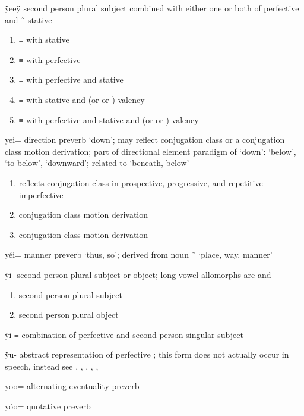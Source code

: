 \documentclass[12pt,letterpaper,oneside,article]{memoir}
\begin{document}
\begin{morphdesc}[resume*=alphalist]
\item[ÿeeÿ]
	second person plural subject  combined with either one or both of
		 perfective
		and  \~\  stative
	\begin{enumerate}
	\item	{} ≡ 
		with  stative
	\item	{} ≡ 
		with  perfective
	\item	{} ≡ 
		with  perfective and  stative
	\item	{} ≡ 
		with  stative and  (or  or ) valency
	\item	{} ≡ 
		with  perfective and  stative and  (or  or ) valency
	\end{enumerate}

\item[yei=]
	direction preverb ‘down’;
	may reflect  conjugation class or a  conjugation class motion derivation;
	part of directional element paradigm of  ‘down’:
		 ‘below’,  ‘to below’,  ‘downward’;
	related to  ‘beneath, below’
	\begin{enumerate}
	\item	reflects  conjugation class in prospective, progressive, and repetitive imperfective
	\item	{} conjugation class motion derivation
	\item	{} conjugation class motion derivation
	\end{enumerate}

\item[yéi=]
	manner preverb ‘thus, so’;
	derived from noun  \~\  ‘place, way, manner’

\item[ÿi-]
	second person plural subject or object; long vowel allomorphs are  and 
	\begin{enumerate}
	\item	second person plural subject
	\item	second person plural object
	\end{enumerate}

\item[ÿi]
	≡ 
	combination of perfective  and
		second person singular subject 

\item[ÿu-]
	abstract representation of perfective ;
	this form does not actually occur in speech, instead see
		, , ,  , , 

\item[yoo=]
	alternating eventuality preverb

\item[yóo=]
	quotative preverb

\end{morphdesc}
\end{document}

